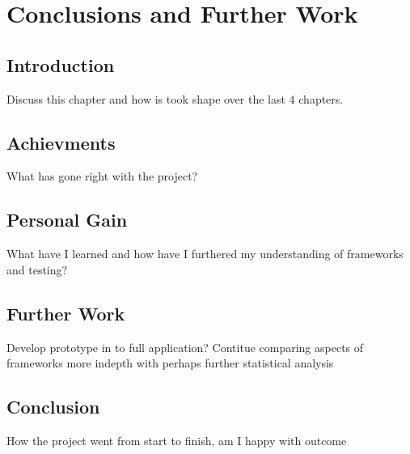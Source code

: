 \chapter*{Conclusions and Further Work}
\section{Introduction}
Discuss this chapter and how is took shape over the last 4 chapters.
\section{Achievments}
What has gone right with the project?
\section{Personal Gain}
What have I learned and how have I furthered my understanding of frameworks and testing?
\section{Further Work}
Develop prototype in to full application? Contitue comparing aspects of frameworks
more indepth with perhaps further statistical analysis
\section{Conclusion}
How the project went from start to finish, am I happy with outcome